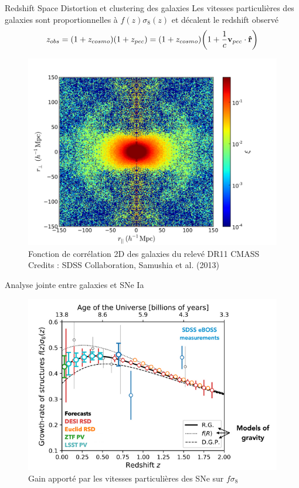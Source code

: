 \documentclass{beamer}
\newcommand{\credits}[1]{\tiny Credits : #1}
\begin{document}
\begin{frame}{Redshift Space Distortion et clustering des galaxies}
	Les vitesses particulières des galaxies sont proportionnelles à $f(z) \sigma_8(z)$ et décalent le redshift observé
	\begin{equation}
		z_{obs} = (1+z_{cosmo}) (1 + z_{pec}) = (1+z_{cosmo}) \qty(1 + \frac{1}{c} \vb v_{pec} \cdot \vu r)
	\end{equation}
	\begin{figure}
		\centering
		\includegraphics[height=0.5\textheight]{figures/FoG.png}
		\caption{Fonction de corrélation 2D des galaxies du relevé DR11 CMASS\\ \credits{SDSS Collaboration, Samushia et al. (2013)}}
	\end{figure}
\end{frame}
		
\begin{frame}{Analyse jointe entre galaxies et SNe Ia}
\begin{figure}
	\centering
	\includegraphics[height=0.7\textheight]{figures/fs8.png}
	\caption{Gain apporté par les vitesses particulières des SNe sur $f\sigma_8$}
\end{figure}
\end{frame}
\end{document}
